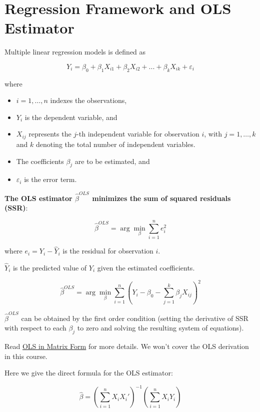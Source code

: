 \documentclass[
  12pt,
  a4paper,
]{scrbook}
\providecommand{\tightlist}{%
  \setlength{\itemsep}{0pt}\setlength{\parskip}{0pt}}
\renewcommand{\tightlist}{\setlength{\itemsep}{0.5\baselineskip}\setlength{\parskip}{0.2\baselineskip}}
\theoremstyle{plain}
\theoremstyle{definition}
\theoremstyle{remark}
\begin{document}
\section{Regression Framework and OLS
Estimator}\label{regression-framework-and-ols-estimator}

Multiple linear regression models is defined as

\[
Y_i = \beta_0 + \beta_1 X_{i1} + \beta_2 X_{i2} + ... + \beta_k X_{ik} + \varepsilon_i
\]

where

\begin{itemize}
\tightlist
\item
  \(i=1,\ldots, n\) indexes the observations,
\item
  \(Y_i\) is the dependent variable, and
\item
  \(X_{ij}\) represents the \(j\)-th independent variable for
  observation \(i\), with \(j = 1, \ldots, k\) and \(k\) denoting the
  total number of independent variables.
\item
  The coefficients \(\beta_j\) are to be estimated, and
\item
  \(\varepsilon_i\) is the error term.
\end{itemize}

\textbf{The OLS estimator \(\hat{\beta}^{OLS}\) minimizes the sum of
squared residuals (SSR)}:

\[
\hat{\beta}^{OLS} = \arg\min_{\beta} \sum_{i=1}^{n} e_i^2 
\]

where \(e_i = Y_i - \hat{Y}_i\) is the residual for observation \(i\).

\(\hat{Y}_i\) is the predicted value of \(Y_i\) given the estimated
coefficients.

\[
\hat{\beta}^{OLS} = \arg\min_{\beta} \sum_{i=1}^{n} (Y_i - \beta_0 - \sum_{j=1}^{k} \beta_j X_{ij})^2
\]

\(\hat{\beta}^{OLS}\) can be obtained by the first order condition
(setting the derivative of SSR with respect to each \(\beta_j\) to zero
and solving the resulting system of equations).

Read
\href{https://github.com/my1396/FIN5005-Fall2024/blob/a4ec0c87c6bcbd463b4da1ad78878b1fe329cda4/images/matrix_OLS_NYU_notes.pdf}{OLS
in Matrix Form} for more details. We won't cover the OLS derivation in
this course.

Here we give the direct formula for the OLS estimator:

\[
\hat\beta = \left(\sum_{i=1}^n X_iX_i'\right)^{-1} \left(\sum_{i=1}^n X_iY_i\right)
\]
\end{document}
